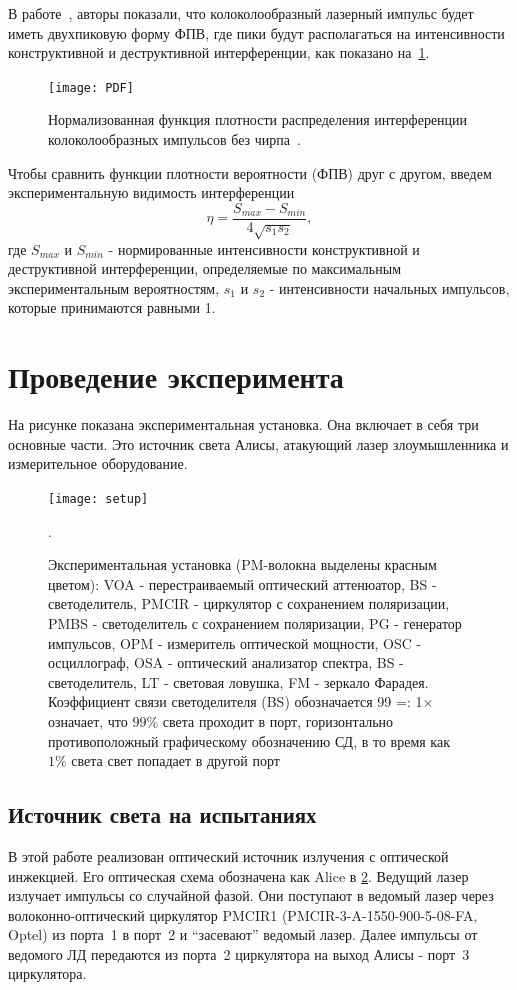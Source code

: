В работе~\cite{shakhovoy2021}, авторы показали, что колоколообразный лазерный импульс будет иметь двухпиковую форму ФПВ, где пики будут располагаться на интенсивности конструктивной и деструктивной интерференции, как показано на~\cref{fig:PDF}.
\begin{figure}
\texttt{[image: PDF]}
\caption{Нормализованная функция плотности распределения интерференции колоколообразных импульсов без чирпа~\cite{shakhovoy2021}.}
\label{fig:PDF}
\end{figure}
Чтобы сравнить функции плотности вероятности (ФПВ) друг с другом, введем экспериментальную видимость интерференции
\begin{equation}
\label{eq:visibility}
	\eta = {\frac{S_{max} - S_{min}}{4\sqrt{s_1 s_2}}},
\end{equation}
где $S_{max}$ и $S_{min}$ - нормированные интенсивности конструктивной и деструктивной интерференции, определяемые по максимальным экспериментальным вероятностям, $s_1$ и $s_2$ - интенсивности начальных импульсов, которые принимаются равными 1.
\section{Проведение эксперимента}\label{ch:ch5/sect3}
\label{sec:experiment} 

На рисунке  показана экспериментальная установка. Она включает в себя три основные части. Это источник света Алисы, атакующий лазер злоумышленника и измерительное оборудование.
\begin{figure}
\texttt{[image: setup]}
\caption{Экспериментальная установка (PM-волокна выделены красным цветом): VOA - перестраиваемый оптический аттенюатор, BS - светоделитель, PMCIR - циркулятор с сохранением поляризации, PMBS - светоделитель с сохранением поляризации, PG - генератор импульсов, OPM - измеритель оптической мощности, OSC - осциллограф, OSA - оптический анализатор спектра, BS - светоделитель, LT - световая ловушка, FM - зеркало Фарадея. Коэффициент связи светоделителя (BS) обозначается 99 =: 1× означает, что $99\%$ света проходит в порт, горизонтально противоположный графическому обозначению СД, в то время как $1\%$ света
свет попадает в другой порт}.
\label{fig:setup}
\end{figure}
\subsection{Источник света на испытаниях}

В этой работе реализован оптический источник излучения с оптической инжекцией. Его оптическая схема обозначена как Alice в \cref{fig:setup}. Ведущий лазер излучает импульсы со случайной фазой. Они поступают в ведомый лазер через волоконно-оптический циркулятор PMCIR1 (PMCIR-3-A-1550-900-5-08-FA, Optel) из порта~1 в порт~2 и ``засевают'' ведомый лазер. Далее импульсы от ведомого ЛД передаются из порта~2 циркулятора на выход Алисы - порт~3 циркулятора.

